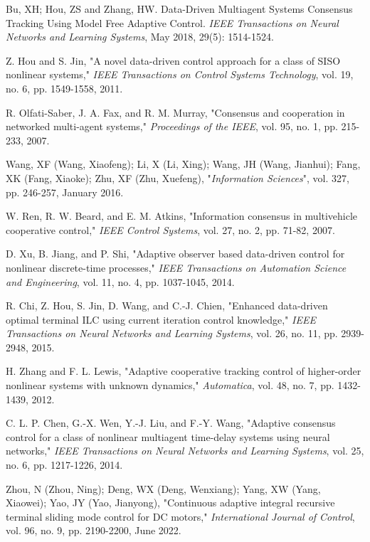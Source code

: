 \documentclass[journal,onecolumn]{IEEEtran}
\begin{document}
\begin{thebibliography}{99}
    
    Bu, XH; Hou, ZS and Zhang, HW. Data-Driven Multiagent Systems Consensus Tracking Using Model Free Adaptive Control. \textit{IEEE Transactions on Neural Networks and Learning Systems}, May 2018, 29(5): 1514-1524.
    
    Z. Hou and S. Jin, "A novel data-driven control approach for a class of SISO nonlinear systems," \textit{IEEE Transactions on Control Systems Technology}, vol. 19, no. 6, pp. 1549-1558, 2011.
    
    R. Olfati-Saber, J. A. Fax, and R. M. Murray, "Consensus and cooperation in networked multi-agent systems," \textit{Proceedings of the IEEE}, vol. 95, no. 1, pp. 215-233, 2007.
    
    Wang, XF (Wang, Xiaofeng); Li, X (Li, Xing); Wang, JH (Wang, Jianhui); Fang, XK (Fang, Xiaoke); Zhu, XF (Zhu, Xuefeng), "\textit{Information Sciences}", vol. 327, pp. 246-257, January 2016.
    
    W. Ren, R. W. Beard, and E. M. Atkins, "Information consensus in multivehicle cooperative control," \textit{IEEE Control Systems}, vol. 27, no. 2, pp. 71-82, 2007.
    
    D. Xu, B. Jiang, and P. Shi, "Adaptive observer based data-driven control for nonlinear discrete-time processes," \textit{IEEE Transactions on Automation Science and Engineering}, vol. 11, no. 4, pp. 1037-1045, 2014.
    
    R. Chi, Z. Hou, S. Jin, D. Wang, and C.-J. Chien, "Enhanced data-driven optimal terminal ILC using current iteration control knowledge," \textit{IEEE Transactions on Neural Networks and Learning Systems}, vol. 26, no. 11, pp. 2939-2948, 2015.
    
    H. Zhang and F. L. Lewis, "Adaptive cooperative tracking control of higher-order nonlinear systems with unknown dynamics," \textit{Automatica}, vol. 48, no. 7, pp. 1432-1439, 2012.
    
    C. L. P. Chen, G.-X. Wen, Y.-J. Liu, and F.-Y. Wang, "Adaptive consensus control for a class of nonlinear multiagent time-delay systems using neural networks," \textit{IEEE Transactions on Neural Networks and Learning Systems}, vol. 25, no. 6, pp. 1217-1226, 2014.
    
    Zhou, N (Zhou, Ning); Deng, WX (Deng, Wenxiang); Yang, XW (Yang, Xiaowei); Yao, JY (Yao, Jianyong), "Continuous adaptive integral recursive terminal sliding mode control for DC motors," \textit{International Journal of Control}, vol. 96, no. 9, pp. 2190-2200, June 2022.
    

\end{thebibliography}
\end{document}
